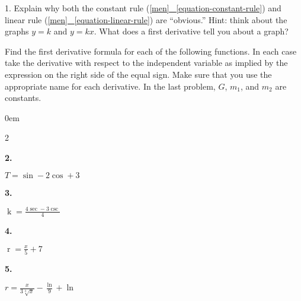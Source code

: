 \documentclass[12pt,]{book}
\theoremstyle{plain}
\theoremstyle{definition}
\numberwithin{equation}{section}
\newenvironment{exercisegroup}%
{\medskip\noindent}%
{\par\bigskip}%
\newlength{\exercisegroupindent}%
\newlength{\exercisegroupitemwidth}%
\newenvironment{exercisegrouplist}%
{\vspace{-\partopsep}%
\begin{adjustwidth}{\exercisegroupindent}{0em}}%
{\end{adjustwidth}%
\vspace{-\partopsep}%
\vspace{\baselineskip}}%
\newenvironment{exercisegroupbycol}[1]%
{\begin{exercisegrouplist}%
\vspace{-\multicolsep}%
\begin{multicols}{#1}%
\setlength{\parindent}{0em}%
\setlength{\exercisegroupitemwidth}{\linewidth}}%
{\end{multicols}%
\vspace{-\multicolsep}%
\end{exercisegrouplist}}%
\newenvironment{exercisegroupitem}[1]%
{\begin{minipage}[t]{\exercisegroupitemwidth}
\vspace{0pt}%
{\bfseries#1}%
\rule{0pt}{\baselineskip}}{\strut%
\end{minipage}%
\hspace{\columnsep}}%
\providecommand\phantomsection{}
\newcommand{\fe}[2]{\mathop{{#1}{\left(#2\right)}}}
\begin{document}
\begin{exerciselist}
\item[1.]\phantomsection\hypertarget{exercise-243}{\null}Explain why both the constant rule (\hyperref[equation-constant-rule]{[men]
~\ref*{equation-constant-rule}}) and linear rule (\hyperref[equation-linear-rule]{[men]
~\ref*{equation-linear-rule}}) are ``obvious.'' Hint: think about the graphs \(y=k\) and \(y=kx\).  What does a first derivative tell you about a graph?%
\par\smallskip
\end{exerciselist}
\begin{exercisegroup}%
Find the first derivative formula for each of the following functions.  In each case take the derivative with respect to the independent variable as implied by the expression on the right side of the equal sign.  Make sure that you use the appropriate name for each derivative. In the last problem, \(G\), \(m_1\), and \(m_2\) are constants.%
\begin{exercisegroupbycol}{2}%
\begin{exercisegroupitem}{2. }\phantomsection\hypertarget{exercise-244}{\null}
\(T=\fe{\sin}{t}-2\fe{\cos}{t}+3\)%
\end{exercisegroupitem}%
\par%
\begin{exercisegroupitem}{3. }\phantomsection\hypertarget{exercise-245}{\null}
\(\fe{k}{\theta}=\frac{4\fe{\sec}{\theta}-3\fe{\csc}{\theta}}{4}\)%
\end{exercisegroupitem}%
\par%
\begin{exercisegroupitem}{4. }\phantomsection\hypertarget{exercise-246}{\null}
\(\fe{r}{x}=\frac{x}{5}+7\)%
\end{exercisegroupitem}%
\par%
\begin{exercisegroupitem}{5. }\phantomsection\hypertarget{exercise-247}{\null}
\(r=\frac{x}{3\sqrt[3]{x}}-\frac{\fe{\ln}{x}}{9}+\fe{\ln}{2}\)%
\end{exercisegroupitem}%
\par%
\end{exercisegroupbycol}%
\end{exercisegroup}%
\typeout{************************************************}
\typeout{************************************************}
\end{document}
